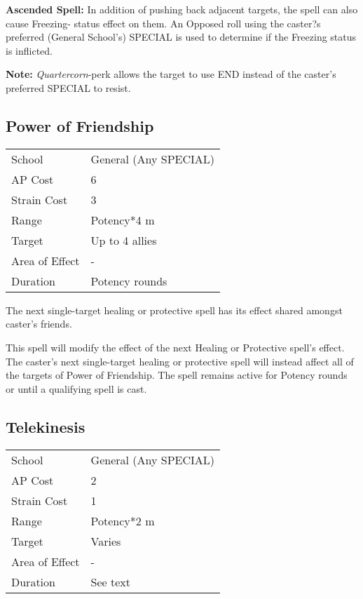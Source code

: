 \documentclass[11pt,a4paper,twocolumn]{book}
\begin{document}
\bigskip

\textbf{Ascended Spell:} In addition of pushing back adjacent targets, the spell can also cause Freezing- status effect on them. An Opposed roll using the caster?s preferred (General School's) SPECIAL is used to determine if the Freezing status is inflicted.

\textbf{Note:} \textit{Quartercorn}-perk allows the target to use END instead of the caster's preferred SPECIAL to resist.

\vfill

\subsection*{Power of Friendship}
{
	\begin{tabu} to 75mm{| X[l,4] | X[l,7] |}
		\hline
		School 			& General (Any SPECIAL) 	\\
		AP Cost	      	& 6 					\\
		Strain Cost     & 3 					\\
		Range     		& Potency*4 m			\\
		Target      	& Up to 4 allies		\\
		Area of Effect  & -  	 				\\
		Duration     	& Potency rounds		\\ \hline
	\end{tabu}
	
}

\medskip

The next single-target healing or protective spell has its effect shared amongst caster's friends.

This spell will modify the effect of the next Healing or Protective spell's effect. The caster's next single-target healing or protective spell will instead affect all of the targets of Power of Friendship. The spell remains active for Potency rounds or until a qualifying spell is cast.


\subsection*{Telekinesis}
{
	\begin{tabu} to 75mm{| X[l,4] | X[l,7] |}
		\hline
		School 			& General (Any SPECIAL) 		\\
		AP Cost	      	& 2 						\\
		Strain Cost     & 1 						\\
		Range     		& Potency*2 m					\\
		Target      	& Varies					\\
		Area of Effect  & - 	 						\\
		Duration     	& See text					\\ \hline
	\end{tabu}
	
}
\end{document}
